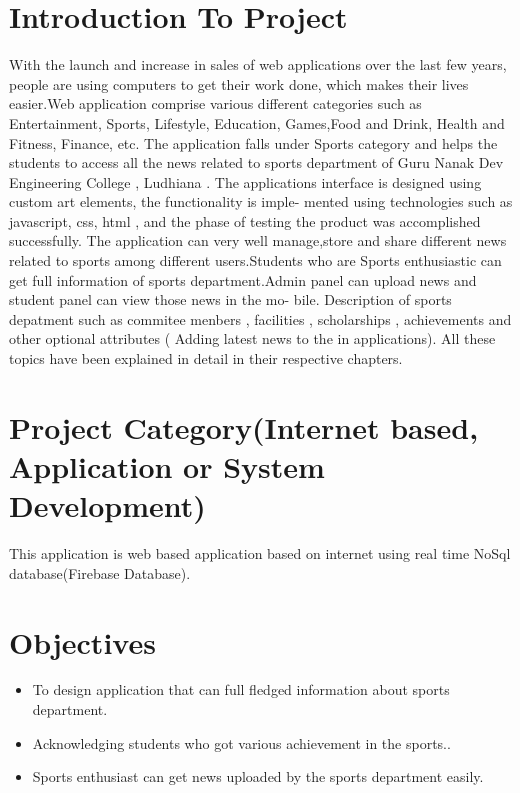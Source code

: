 \section{Introduction To Project} 
With the launch and increase in sales of web applications over the last few years, people are using
computers to get their work done, which makes their lives easier.Web application comprise various different categories such as Entertainment, Sports, Lifestyle, Education,
Games,Food and Drink, Health and Fitness, Finance, etc. The application falls under Sports
category and helps the students to access all the news related to sports department of Guru
Nanak Dev Engineering College , Ludhiana .
The applications interface is designed using custom art elements, the functionality is imple-
mented using technologies such as javascript, css, html , and the phase of testing the product was accomplished successfully. The application can very well manage,store and share different news related to sports
among different users.Students who are Sports enthusiastic can get full information of sports
department.Admin panel can upload news and student panel can view those news in the mo-
bile. Description of sports depatment such as commitee menbers , facilities , scholarships ,
achievements and other optional attributes ( Adding latest news to the in applications). All
these topics have been explained in detail in their respective chapters.

\section{Project Category(Internet based, Application or System Development)}
This application is web based application based on internet using real time NoSql database(Firebase Database).

\section{Objectives}

\begin{itemize}
	\item  To design application that can full fledged information about sports department.

	\item Acknowledging students who got various achievement in the sports..
	
	\item Sports enthusiast can get news uploaded by the sports department easily.


\end{itemize}

